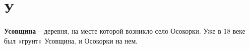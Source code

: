 \chapter*{У}


\textbf{Усовщина} – деревня, на месте которой возникло село Осокорки. Уже в 18 веке был «грунт» Усовщина, и Осокорки на нем.
